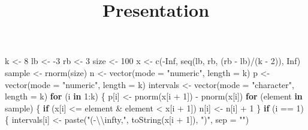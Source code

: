 \documentclass[
]{article}
\title{Presentation}
\author{}
\date{\vspace{-2.5em}}
\newenvironment{Shaded}{\begin{snugshade}}{\end{snugshade}}
\newcommand{\AttributeTok}[1]{\textcolor[rgb]{0.77,0.63,0.00}{#1}}
\newcommand{\ConstantTok}[1]{\textcolor[rgb]{0.00,0.00,0.00}{#1}}
\newcommand{\ControlFlowTok}[1]{\textcolor[rgb]{0.13,0.29,0.53}{\textbf{#1}}}
\newcommand{\DecValTok}[1]{\textcolor[rgb]{0.00,0.00,0.81}{#1}}
\newcommand{\FunctionTok}[1]{\textcolor[rgb]{0.00,0.00,0.00}{#1}}
\newcommand{\NormalTok}[1]{#1}
\newcommand{\OtherTok}[1]{\textcolor[rgb]{0.56,0.35,0.01}{#1}}
\newcommand{\SpecialCharTok}[1]{\textcolor[rgb]{0.00,0.00,0.00}{#1}}
\newcommand{\StringTok}[1]{\textcolor[rgb]{0.31,0.60,0.02}{#1}}
\begin{document}
\maketitle

\begin{Shaded}
\begin{Highlighting}[]
\NormalTok{k }\OtherTok{\textless{}{-}} \DecValTok{8}
\NormalTok{lb }\OtherTok{\textless{}{-}} \SpecialCharTok{{-}}\DecValTok{3}
\NormalTok{rb }\OtherTok{\textless{}{-}} \DecValTok{3}
\NormalTok{size }\OtherTok{\textless{}{-}} \DecValTok{100}
\NormalTok{x }\OtherTok{\textless{}{-}} \FunctionTok{c}\NormalTok{(}\SpecialCharTok{{-}}\ConstantTok{Inf}\NormalTok{, }\FunctionTok{seq}\NormalTok{(lb, rb, (rb }\SpecialCharTok{{-}}\NormalTok{ lb)}\SpecialCharTok{/}\NormalTok{(k }\SpecialCharTok{{-}} \DecValTok{2}\NormalTok{)), }\ConstantTok{Inf}\NormalTok{)}
\NormalTok{sample }\OtherTok{\textless{}{-}} \FunctionTok{rnorm}\NormalTok{(size)}
\NormalTok{n }\OtherTok{\textless{}{-}} \FunctionTok{vector}\NormalTok{(}\AttributeTok{mode =} \StringTok{"numeric"}\NormalTok{, }\AttributeTok{length =}\NormalTok{ k)}
\NormalTok{p }\OtherTok{\textless{}{-}} \FunctionTok{vector}\NormalTok{(}\AttributeTok{mode =} \StringTok{"numeric"}\NormalTok{, }\AttributeTok{length =}\NormalTok{ k)}
\NormalTok{intervals }\OtherTok{\textless{}{-}} \FunctionTok{vector}\NormalTok{(}\AttributeTok{mode =} \StringTok{"character"}\NormalTok{, }\AttributeTok{length =}\NormalTok{ k)}
\ControlFlowTok{for}\NormalTok{ (i }\ControlFlowTok{in} \DecValTok{1}\SpecialCharTok{:}\NormalTok{k) \{}
\NormalTok{    p[i] }\OtherTok{\textless{}{-}} \FunctionTok{pnorm}\NormalTok{(x[i }\SpecialCharTok{+} \DecValTok{1}\NormalTok{]) }\SpecialCharTok{{-}} \FunctionTok{pnorm}\NormalTok{(x[i])}
    \ControlFlowTok{for}\NormalTok{ (element }\ControlFlowTok{in}\NormalTok{ sample) \{}
        \ControlFlowTok{if}\NormalTok{ (x[i] }\SpecialCharTok{\textless{}=}\NormalTok{ element }\SpecialCharTok{\&}\NormalTok{ element }\SpecialCharTok{\textless{}}\NormalTok{ x[i }\SpecialCharTok{+} \DecValTok{1}\NormalTok{]) }
\NormalTok{            n[i] }\OtherTok{\textless{}{-}}\NormalTok{ n[i] }\SpecialCharTok{+} \DecValTok{1}
\NormalTok{    \}}
    \ControlFlowTok{if}\NormalTok{ (i }\SpecialCharTok{==} \DecValTok{1}\NormalTok{) \{}
\NormalTok{        intervals[i] }\OtherTok{\textless{}{-}} \FunctionTok{paste}\NormalTok{(}\StringTok{"({-}}\SpecialCharTok{\textbackslash{}\textbackslash{}}\StringTok{infty,"}\NormalTok{, }\FunctionTok{toString}\NormalTok{(x[i }\SpecialCharTok{+} \DecValTok{1}\NormalTok{]), }\StringTok{")"}\NormalTok{, }\AttributeTok{sep =} \StringTok{""}\NormalTok{)}

\end{Highlighting}
\end{Shaded}
\end{document}
